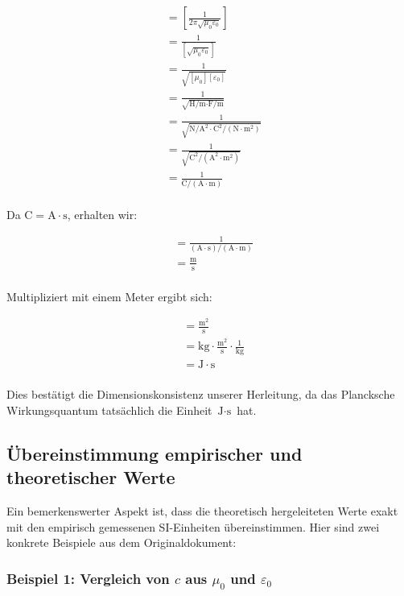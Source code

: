 \documentclass{article}
\begin{document}
	\begin{align}
		[h] &= \left[ \frac{1}{2\pi\sqrt{\mu_0\varepsilon_0}} \right] \\
		&= \frac{1}{[\sqrt{\mu_0\varepsilon_0}]} \\
		&= \frac{1}{\sqrt{[\mu_0][\varepsilon_0]}} \\
		&= \frac{1}{\sqrt{\text{H/m} \cdot \text{F/m}}} \\
		&= \frac{1}{\sqrt{\text{N}/\text{A}^2 \cdot \text{C}^2/(\text{N} \cdot \text{m}^2)}} \\
		&= \frac{1}{\sqrt{\text{C}^2/(\text{A}^2 \cdot \text{m}^2)}} \\
		&= \frac{1}{\text{C}/(\text{A} \cdot \text{m})} \\
	\end{align}
	
	Da $\text{C} = \text{A} \cdot \text{s}$, erhalten wir:
	
	\begin{align}
		[h] &= \frac{1}{(\text{A} \cdot \text{s})/(\text{A} \cdot \text{m})} \\
		&= \frac{\text{m}}{\text{s}} \\
	\end{align}
	
	Multipliziert mit einem Meter ergibt sich:
	
	\begin{align}
		[h \cdot \text{m}] &= \frac{\text{m}^2}{\text{s}} \\
		&= \text{kg} \cdot \frac{\text{m}^2}{\text{s}} \cdot \frac{1}{\text{kg}} \\
		&= \text{J} \cdot \text{s} \\
	\end{align}
	
	Dies bestätigt die Dimensionskonsistenz unserer Herleitung, da das Plancksche Wirkungsquantum tatsächlich die Einheit $\text{J} \cdot \text{s}$ hat.
	
	\subsection{Übereinstimmung empirischer und theoretischer Werte}
	
	Ein bemerkenswerter Aspekt ist, dass die theoretisch hergeleiteten Werte exakt mit den empirisch gemessenen SI-Einheiten übereinstimmen. Hier sind zwei konkrete Beispiele aus dem Originaldokument:
	
	\subsubsection{Beispiel 1: Vergleich von $c$ aus $\mu_0$ und $\varepsilon_0$}
	
\end{document}
